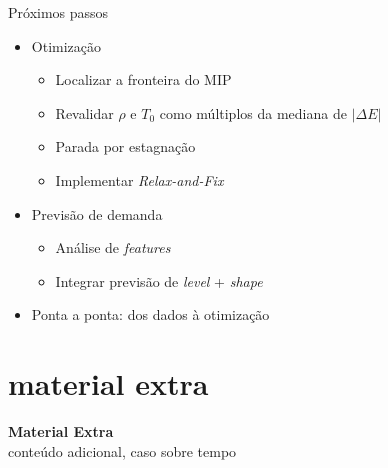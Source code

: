\documentclass[aspectratio=169,11pt]{beamer}
\begin{document}
\begin{frame}{Próximos passos}
    \begin{itemize}
        \item Otimização
            \begin{itemize}
                \item Localizar a fronteira do MIP
                \item Revalidar $\rho$ e $T_0$ como múltiplos da mediana de $|\Delta E|$
                \item Parada por estagnação
                \item Implementar \textit{Relax-and-Fix}
            \end{itemize}
        \item Previsão de demanda
            \begin{itemize}
                \item Análise de \textit{features}
                \item Integrar previsão de \textit{level} + \textit{shape}
            \end{itemize}
        \item Ponta a ponta: dos dados à otimização
    \end{itemize}
\end{frame}

\section{material extra}

\begin{frame}
  \centering
  \vfill
  {\Huge\bfseries Material Extra}\\[0.6em]
  {\large conteúdo adicional, caso sobre tempo}
  \vfill
\end{frame}
\end{document}

